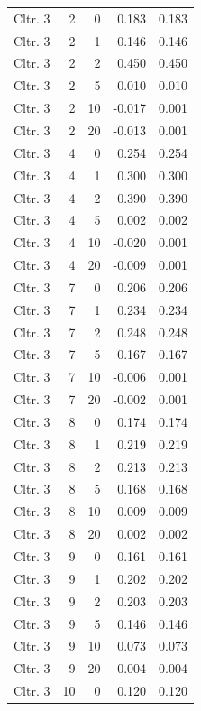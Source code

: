 \begin{longtable}{lrrrr}
  Cltr. 3 &    2 &    0 & 0.183 & 0.183 \\ 
  Cltr. 3 &    2 &    1 & 0.146 & 0.146 \\ 
  Cltr. 3 &    2 &    2 & 0.450 & 0.450 \\ 
  Cltr. 3 &    2 &    5 & 0.010 & 0.010 \\ 
  Cltr. 3 &    2 &   10 & -0.017 & 0.001 \\ 
  Cltr. 3 &    2 &   20 & -0.013 & 0.001 \\ 
  Cltr. 3 &    4 &    0 & 0.254 & 0.254 \\ 
  Cltr. 3 &    4 &    1 & 0.300 & 0.300 \\ 
  Cltr. 3 &    4 &    2 & 0.390 & 0.390 \\ 
  Cltr. 3 &    4 &    5 & 0.002 & 0.002 \\ 
  Cltr. 3 &    4 &   10 & -0.020 & 0.001 \\ 
  Cltr. 3 &    4 &   20 & -0.009 & 0.001 \\ 
  Cltr. 3 &    7 &    0 & 0.206 & 0.206 \\ 
  Cltr. 3 &    7 &    1 & 0.234 & 0.234 \\ 
  Cltr. 3 &    7 &    2 & 0.248 & 0.248 \\ 
  Cltr. 3 &    7 &    5 & 0.167 & 0.167 \\ 
  Cltr. 3 &    7 &   10 & -0.006 & 0.001 \\ 
  Cltr. 3 &    7 &   20 & -0.002 & 0.001 \\ 
  Cltr. 3 &    8 &    0 & 0.174 & 0.174 \\ 
  Cltr. 3 &    8 &    1 & 0.219 & 0.219 \\ 
  Cltr. 3 &    8 &    2 & 0.213 & 0.213 \\ 
  Cltr. 3 &    8 &    5 & 0.168 & 0.168 \\ 
  Cltr. 3 &    8 &   10 & 0.009 & 0.009 \\ 
  Cltr. 3 &    8 &   20 & 0.002 & 0.002 \\ 
  Cltr. 3 &    9 &    0 & 0.161 & 0.161 \\ 
  Cltr. 3 &    9 &    1 & 0.202 & 0.202 \\ 
  Cltr. 3 &    9 &    2 & 0.203 & 0.203 \\ 
  Cltr. 3 &    9 &    5 & 0.146 & 0.146 \\ 
  Cltr. 3 &    9 &   10 & 0.073 & 0.073 \\ 
  Cltr. 3 &    9 &   20 & 0.004 & 0.004 \\ 
  Cltr. 3 &   10 &    0 & 0.120 & 0.120 \\ 

\end{longtable}
